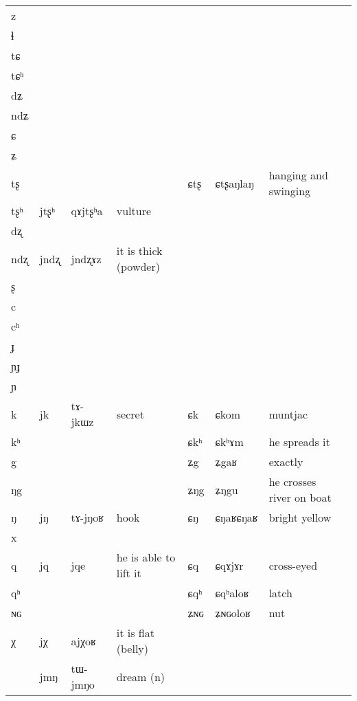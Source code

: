 \documentclass[oldfontcommands,oneside,a4paper,11pt]{article}
\newcommand{\ipa}[1]{{\phon #1}} %
\newcommand{\idph}[1]{\cellcolor{gray}\textbf{#1}}
\begin{document}
\begin{table}
{\begin{tabular}{l|lll|lll|l}
\ipa{z}  & 	  & 	  & 	  & 	  & 	  & 	  & 	\\
\ipa{ɬ}  & 	  & 	  & 	  & 	  & 	  & 	  & 	\\
\ipa{tɕ}  & 	  & 	  & 	  & 	  & 	  & 	  & 	\\
\ipa{tɕʰ}  & 	  & 	  & 	  & 	  & 	  & 	  & 	\\
\ipa{dʑ}  & 	  & 	  & 	  & 	  & 	  & 	  & 	\\
\ipa{ndʑ}  & 	  & 	  & 	  & 	  & 	  & 	  & 	\\
\ipa{ɕ}  & 	  & 	  & 	  & 	  & 	  & 	  & 	\\
\ipa{ʑ}  & 	  & 	  & 	  & 	  & 	  & 	  & 	\\
\ipa{tʂ}  & 	  & 	  & 	  & 	 \ipa{ɕtʂ} \idph{}  & 	 \ipa{ɕtʂaŋlaŋ}  & 	 hanging and swinging & 	\\
\ipa{tʂʰ}  & 	 \ipa{jtʂʰ}  & 	 \ipa{qɤjtʂʰa}  & 	vulture  & 	  & 	  & 	  & 	\\
\ipa{dʐ}  & 	  & 	  & 	  & 	  & 	  & 	  & 	\\
\ipa{ndʐ}  & 	 \ipa{jndʐ}  & 	 \ipa{jndʐɤz}  & 	it is thick (powder)  & 	  & 	  & 	  & 	\\
\ipa{ʂ}  & 	  & 	  & 	  & 	  & 	  & 	  & 	\\
\ipa{c}  & 	  & 	  & 	  & 	  & 	  & 	  & 	\\
\ipa{cʰ}  & 	  & 	  & 	  & 	  & 	  & 	  & 	\\
\ipa{ɟ}  & 	  & 	  & 	  & 	  & 	  & 	  & 	\\
\ipa{ɲɟ}  & 	  & 	  & 	  & 	  & 	  & 	  & 	\\
\ipa{ɲ}  & 	  & 	  & 	  & 	  & 	  & 	  & 	\\
\ipa{k}  &	 \ipa{jk}  &	 \ipa{tɤ-jkɯz}  &	 secret  &	 \ipa{ɕk}  &	 \ipa{ɕkom}  &	 muntjac  &	\\	
\ipa{kʰ}  &	  &	  &	  &	 \ipa{ɕkʰ}  &	 \ipa{ɕkʰɤm}  &	 he spreads it  &	\\	
\ipa{g}  &	  &	  &	  &	 \ipa{ʑg}  &	 \ipa{ʑgaʁ}  &	 exactly  &	\\	
\ipa{ŋg}  &	  &	  &	  &	 \ipa{ʑŋg}  &	 \ipa{ʑŋgu}  &	 he crosses river on boat  &	\\	
\ipa{ŋ}  &	 \ipa{jŋ}  &	 \ipa{tɤ-jŋoʁ}  &	 hook  &	 \ipa{ɕŋ} \idph{}  &	 \ipa{ɕŋaʁɕŋaʁ}  &	 bright yellow  &	\\	
\ipa{x}  &	  &	  &	  &	  &	  &	  &	\\	
\ipa{q}  &	 \ipa{jq}  &	 \ipa{jqe}  &	 he is able to lift it  &	 \ipa{ɕq}  &	 \ipa{ɕqɤjɤr}  &	 cross-eyed  &	\\	
\ipa{qʰ}  &	  &	  &	  &	 \ipa{ɕqʰ}  &	 \ipa{ɕqʰaloʁ}  &	 latch  &	\\	
\ipa{ɴɢ}  &	  &	  &	  &	 \ipa{ʑɴɢ}  &	 \ipa{ʑɴɢoloʁ}  &	 nut  &	\\	
\ipa{χ}  &	 \ipa{jχ}  &	 \ipa{ajχoʁ}  &	 it is flat (belly)  &	  &	  &	  &	\\	
\midrule  					 
 &\ipa{jmŋ} & \ipa{tɯ-jmŋo} &dream (n) \\  
  \end{tabular}}
\end{table}
  
\end{document}
